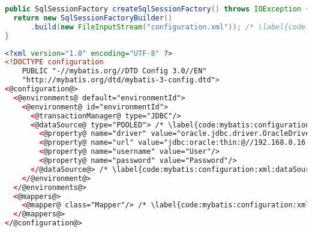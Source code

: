 
\begin{lstlisting}[language=Java, belowskip=-2mm]
public SqlSessionFactory createSqlSessionFactory() throws IOException {
  return new SqlSessionFactoryBuilder()
      .build(new FileInputStream("configuration.xml")); /* \label{code:mybatis:sessionFactory:xml:file} */
}
\end{lstlisting}

\begin{lstlisting}[language=XML, caption={Configuration of \Code{SqlSessionFactory} using external XML configuration file}, label={code:mybatis:sessionFactory:xml}]
<?xml version="1.0" encoding="UTF-8" ?>
<!DOCTYPE configuration
    PUBLIC "-//mybatis.org//DTD Config 3.0//EN"
    "http://mybatis.org/dtd/mybatis-3-config.dtd">
<@configuration@>
  <@environments@ default="environmentId">
    <@environment@ id="environmentId">
      <@transactionManager@ type="JDBC"/>
      <@dataSource@ type="POOLED"> /* \label{code:mybatis:configuration:xml:dataSource:begin} */
        <@property@ name="driver" value="oracle.jdbc.driver.OracleDriver"/>
        <@property@ name="url" value="jdbc:oracle:thin:@//192.168.0.16:1521/orcl"/>
        <@property@ name="username" value="User"/>
        <@property@ name="password" value="Password"/>
      </@dataSource@> /* \label{code:mybatis:configuration:xml:dataSource:end} */
    </@environment@>
  </@environments@>
  <@mappers@>
    <@mapper@ class="Mapper"/> /* \label{code:mybatis:configuration:xml:mapper} */
  </@mappers@>
</@configuration@>
\end{lstlisting}
